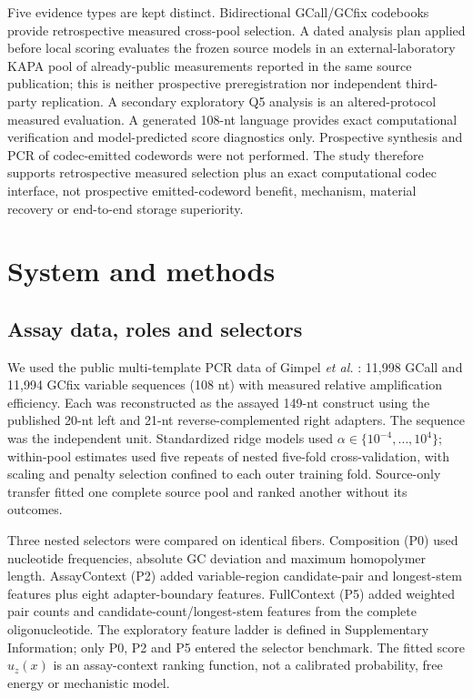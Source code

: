 \documentclass[unnumsec,webpdf,modern,large]{oup-authoring-template}
\begin{document}
Five evidence types are kept distinct. Bidirectional GCall/GCfix codebooks provide retrospective measured cross-pool selection. A dated analysis plan applied before local scoring evaluates the frozen source models in an external-laboratory KAPA pool of already-public measurements reported in the same source publication; this is neither prospective preregistration nor independent third-party replication. A secondary exploratory Q5 analysis is an altered-protocol measured evaluation. A generated 108-nt language provides exact computational verification and model-predicted score diagnostics only. Prospective synthesis and PCR of codec-emitted codewords were not performed. The study therefore supports retrospective measured selection plus an exact computational codec interface, not prospective emitted-codeword benefit, mechanism, material recovery or end-to-end storage superiority.

\section{System and methods}

\subsection{Assay data, roles and selectors}

We used the public multi-template PCR data of Gimpel \emph{et al.} \cite{gimpel2025pcrbias}: 11,998 GCall and 11,994 GCfix variable sequences (108 nt) with measured relative amplification efficiency. Each was reconstructed as the assayed 149-nt construct using the published 20-nt left and 21-nt reverse-complemented right adapters. The sequence was the independent unit. Standardized ridge models used $\alpha\in\{10^{-4},\ldots,10^4\}$; within-pool estimates used five repeats of nested five-fold cross-validation, with scaling and penalty selection confined to each outer training fold. Source-only transfer fitted one complete source pool and ranked another without its outcomes.

Three nested selectors were compared on identical fibers. Composition (P0) used nucleotide frequencies, absolute GC deviation and maximum homopolymer length. AssayContext (P2) added variable-region candidate-pair and longest-stem features plus eight adapter-boundary features. FullContext (P5) added weighted pair counts and candidate-count/longest-stem features from the complete oligonucleotide. The exploratory feature ladder is defined in Supplementary Information; only P0, P2 and P5 entered the selector benchmark. The fitted score $u_z(x)$ is an assay-context ranking function, not a calibrated probability, free energy or mechanistic model.
\end{document}
